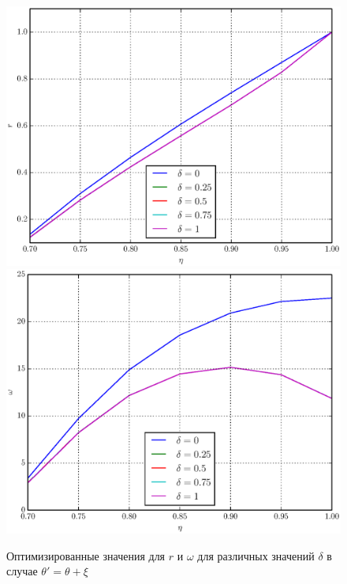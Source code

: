 \documentclass[%
master,         %
subf,           %
href,           %
,times         %
]{disser}
\numberwithin{equation}{section}
\numberwithin{figure}{section}
\begin{document}
\begin{figure}[h]
\includegraphics[scale=0.7]{r_ang.eps}
\includegraphics[scale=0.7]{omega_ang.eps}
\caption{Оптимизированные значения для $r$ и $\omega$ для различных значений $\delta$ в случае $\theta' = \theta + \xi$}
\label{fig:psi_ang}
\end{figure}
\end{document}
